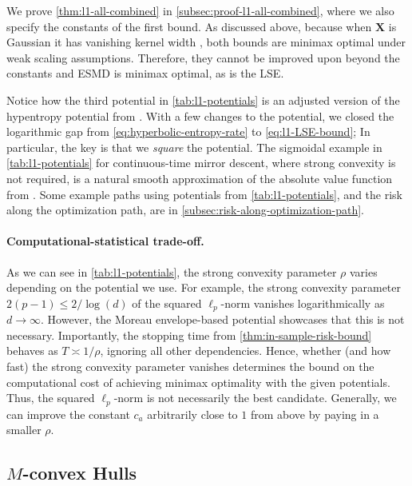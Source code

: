 \documentclass[a4paper]{article}
\newcommand{\X}[0]{\mathbf{X}}
\theoremstyle{thmstyle}
\theoremstyle{defstyle}
\theoremstyle{remark}
\begin{document}
\noindent We prove \cref{thm:l1-all-combined} in \cref{subsec:proof-l1-all-combined}, where we also specify the constants of the first bound.
As discussed above, because when $\X$ is Gaussian it has vanishing kernel width \citep[Proposition 1]{Raskutti2011}, both bounds are minimax optimal under weak scaling assumptions. Therefore, they cannot be improved upon beyond the constants and ESMD is minimax optimal, as is the LSE. 

Notice how the third potential in \cref{tab:l1-potentials} is an adjusted version of the hypentropy potential from \cite{Ghai2020}. With a few changes to the potential, we closed the logarithmic gap from \eqref{eq:hyperbolic-entropy-rate} to \eqref{eq:l1-LSE-bound}; In particular, the key is that we \emph{square} the potential. The sigmoidal example in \cref{tab:l1-potentials} for continuous-time mirror descent, where strong convexity is not required, is a natural smooth approximation of the absolute value function from \cite{Schmidt2007L1approximation}.
Some example paths using potentials from \cref{tab:l1-potentials}, and the risk along the optimization path, are in \cref{subsec:risk-along-optimization-path}.

\paragraph{Computational-statistical trade-off.}
As we can see in \cref{tab:l1-potentials}, the strong convexity parameter $\rho$ varies depending on the potential we use. For example, the strong convexity parameter $2(p-1)\leq 2/\log(d)$ of the squared $\ell_p$-norm vanishes logarithmically as $d\to\infty$. However, the Moreau envelope-based potential showcases that this is not necessary. Importantly, the stopping time from \cref{thm:in-sample-risk-bound} behaves as $T\asymp 1/\rho$, ignoring all other dependencies. Hence, whether (and how fast) the strong convexity parameter vanishes determines the bound on the computational cost of achieving minimax optimality with the given potentials. Thus, the squared $\ell_p$-norm is not necessarily the best candidate.
Generally, we can improve the constant $c_a$ arbitrarily close to $1$ from above by paying in a smaller $\rho$.


\subsection{\texorpdfstring{$M$}{M}-convex Hulls}
\end{document}
